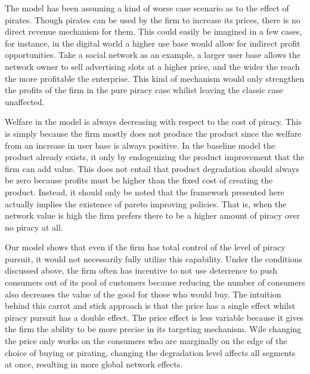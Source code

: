 The model has been assuming a kind of worse case scenario as to the effect of pirates. Though pirates can be used by the firm to increase its prices, there is no direct revenue mechanism for them. This could easily be imagined in a few cases, for instance, in the digital world a higher use base would allow for indirect profit opportunities. Take a social network as an example, a larger user base allows the network owner to sell advertising slots at a higher price, and the wider the reach the more profitable the enterprise. This kind of mechanism would only strengthen the profits of the firm in the pure piracy case whilist leaving the classic case unaffected. 

Welfare in the model is always decreasing with respect to the cost of piracy. This is simply because the firm mostly does not produce the product since the welfare from an increase in user base is always positive. In the baseline model the product already exists, it only by endogenizing the product improvement that the firm can add value. This does not entail that product degradation should always be zero because profits must be higher than the fixed cost of creating the product. Instead, it should only be noted that the framework presented here actually implies the existence of pareto improving policies. That is, when the network value is high the firm prefers there to be a higher amount of piracy over no piracy at all. 


Our model shows that even if the firm has total control of the level of piracy pursuit, it would not necessarily fully utilize this capability. Under the conditions discussed above, the firm often has incentive to not use deterrence to push consumers out of its pool of customers because reducing the number of consumers also decreases the value of the good for those who would buy. The intuition behind this carrot and stick approach is that the price has a single effect whilst piracy pursuit has a double effect. The price effect is less variable because it gives the firm the ability to be more precise in its targeting mechanism. Wile changing the price only works on the consumers who are marginally on the edge of the choice of buying or pirating, changing the degradation level affects all segments at once, resulting in more global network effects. 

